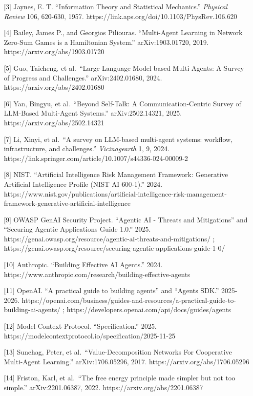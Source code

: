 \documentclass[11pt]{article}
\begin{document}
{[}3{]} Jaynes, E. T. ``Information Theory and Statistical Mechanics.'' \emph{Physical Review} 106, 620-630, 1957. https://link.aps.org/doi/10.1103/PhysRev.106.620

{[}4{]} Bailey, James P., and Georgios Piliouras. ``Multi-Agent Learning in Network Zero-Sum Games is a Hamiltonian System.'' arXiv:1903.01720, 2019. https://arxiv.org/abs/1903.01720

{[}5{]} Guo, Taicheng, et al.~``Large Language Model based Multi-Agents: A Survey of Progress and Challenges.'' arXiv:2402.01680, 2024. https://arxiv.org/abs/2402.01680

{[}6{]} Yan, Bingyu, et al.~``Beyond Self-Talk: A Communication-Centric Survey of LLM-Based Multi-Agent Systems.'' arXiv:2502.14321, 2025. https://arxiv.org/abs/2502.14321

{[}7{]} Li, Xinyi, et al.~``A survey on LLM-based multi-agent systems: workflow, infrastructure, and challenges.'' \emph{Vicinagearth} 1, 9, 2024. https://link.springer.com/article/10.1007/s44336-024-00009-2

{[}8{]} NIST. ``Artificial Intelligence Risk Management Framework: Generative Artificial Intelligence Profile (NIST AI 600-1).'' 2024. https://www.nist.gov/publications/artificial-intelligence-risk-management-framework-generative-artificial-intelligence

{[}9{]} OWASP GenAI Security Project. ``Agentic AI - Threats and Mitigations'' and ``Securing Agentic Applications Guide 1.0.'' 2025. https://genai.owasp.org/resource/agentic-ai-threats-and-mitigations/ ; https://genai.owasp.org/resource/securing-agentic-applications-guide-1-0/

{[}10{]} Anthropic. ``Building Effective AI Agents.'' 2024. https://www.anthropic.com/research/building-effective-agents

{[}11{]} OpenAI. ``A practical guide to building agents'' and ``Agents SDK.'' 2025-2026. https://openai.com/business/guides-and-resources/a-practical-guide-to-building-ai-agents/ ; https://developers.openai.com/api/docs/guides/agents

{[}12{]} Model Context Protocol. ``Specification.'' 2025. https://modelcontextprotocol.io/specification/2025-11-25

{[}13{]} Sunehag, Peter, et al.~``Value-Decomposition Networks For Cooperative Multi-Agent Learning.'' arXiv:1706.05296, 2017. https://arxiv.org/abs/1706.05296

{[}14{]} Friston, Karl, et al.~``The free energy principle made simpler but not too simple.'' arXiv:2201.06387, 2022. https://arxiv.org/abs/2201.06387
\end{document}
